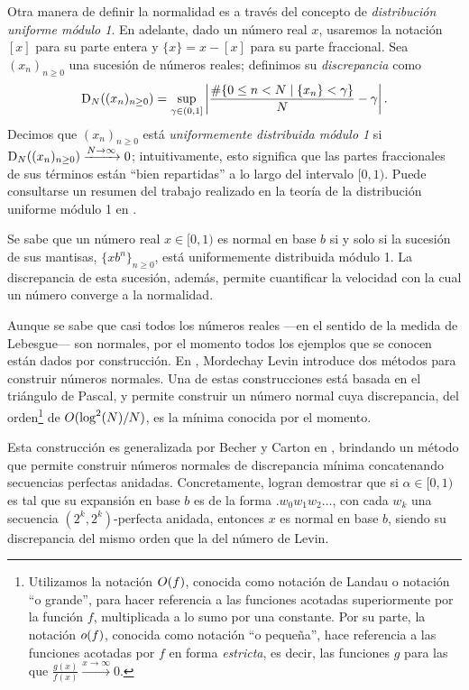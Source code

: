 \medskip

Otra manera de definir la normalidad es a través del concepto de
\emph{distribución uniforme módulo 1}.
En adelante, dado un número real $x$, usaremos
la notación $[x]$ para su parte entera y $\lbrace x \rbrace = x - [x]$ para su parte fraccional.
Sea $(x_n)_{n\geq0}$ una sucesión de números reales; definimos su
\emph{discrepancia} como
\[
	\operatorname{D}_{N}((x_n)_{n \geq 0})
	= \sup_{\gamma \in (0,1]} \left\vert
		\frac{\# \lbrace 0 \leq n < N \;\vert\; \lbrace x_n \rbrace < \gamma \rbrace}
		{N} - \gamma
	\right\vert.
\]
Decimos que $(x_n)_{n\geq0}$ está
\emph{uniformemente distribuida módulo 1} si ${\operatorname{D}_{N}((x_n)_{n\geq0})
\xrightarrow{N \to \infty} 0}$; intuitivamente, esto significa que las partes
fraccionales de sus términos están ``bien repartidas'' a lo largo del
intervalo $[0, 1)$. Puede consultarse un resumen del trabajo realizado en la
teoría de la distribución uniforme módulo 1 en
\cite{kuipers-uniform-distribution}.

Se sabe que un número real $x \in [0,1)$ es normal en base $b$ si y
solo si la sucesión de sus mantisas, $\lbrace x b^n \rbrace_{n\geq0}$,
está uniformemente distribuida módulo 1. La discrepancia de esta sucesión,
además, permite cuantificar la velocidad con la cual un número converge a la
normalidad.

\medskip

Aunque se sabe que casi todos los números reales ---en el sentido de la medida
de Lebesgue--- son normales, por el momento todos los ejemplos que se conocen
están dados por construcción.
En \cite{levin-discrepancy-estimate}, Mordechay Levin introduce dos
métodos para construir números normales. Una de estas construcciones
\cite[Theorem 2]{levin-discrepancy-estimate} está basada en el triángulo de
Pascal, y permite construir un número normal cuya discrepancia, del
orden\footnote{
	Utilizamos la notación $O(f)$, conocida 
	como notación de Landau o notación ``o grande'', para hacer referencia a las
	funciones acotadas superiormente por la función $f$, multiplicada a lo sumo
	por una constante. Por su parte, la notación $o(f)$, conocida como
	notación ``o pequeña'', hace referencia a las funciones acotadas por $f$
	en forma \emph{estricta}, es decir, las funciones $g$ para las
	que $\frac{g(x)}{f(x)} \xrightarrow{x \to \infty} 0$.
} de $O(\log^2(N)/N)$, es la mínima conocida por el momento.

Esta construcción es generalizada por Becher y Carton en \cite{becher-nested-perfect}, brindando un método que permite construir números
normales de discrepancia mínima concatenando secuencias perfectas anidadas.
Concretamente, logran demostrar que si $\alpha \in [0, 1)$ es tal que su
expansión en base $b$ es de la forma $.w_0 w_1 w_2 \dots$, con cada $w_k$ una
secuencia $(2^k,2^k)$-perfecta anidada, entonces $x$ es normal en base $b$,
siendo su discrepancia del mismo orden que la del número de Levin.

